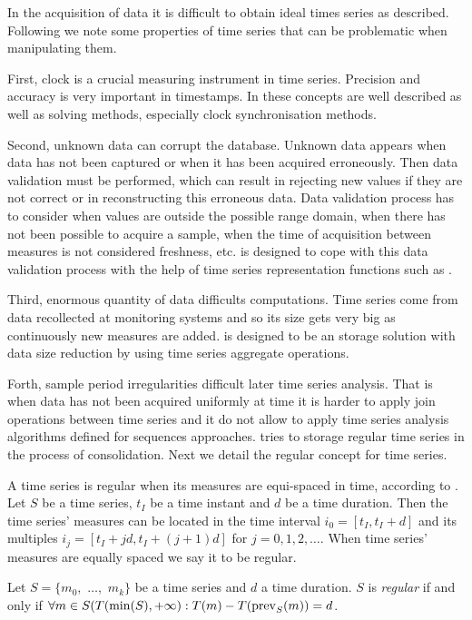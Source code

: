 In the acquisition of data it is difficult to obtain ideal times
series as described. Following we note some properties of time series
that can be problematic when manipulating them.

First, clock is a crucial measuring instrument in time
series. Precision and accuracy is very important in timestamps.  In
\cite{kopetz11:realtime} these concepts are well described as well as
solving methods, especially clock synchronisation methods.


Second, unknown data can corrupt the database. Unknown data appears
when data has not been captured or when it has been acquired
erroneously. Then data validation must be performed, which can result
in rejecting new values if they are not correct or in reconstructing
this erroneous data.  Data validation process has to consider when
values are outside the possible range domain, when there has not been
possible to acquire a sample, when the time of acquisition between
measures is not considered freshness, etc.  is designed to
cope with this data validation process with the help of time series
representation functions such as \zohe{}.


Third, enormous quantity of data difficults computations.  Time series
come from data recollected at monitoring systems and so its size gets
very big as continuously new measures are added.   is
designed to be an storage solution with data size reduction by using
time series aggregate operations.


Forth, sample period irregularities difficult later time series
analysis. That is when data has not been acquired uniformly at time it
is harder to apply join operations between time series and it do not
allow to apply time series analysis algorithms defined for sequences
approaches.   tries to storage regular time series in the
process of consolidation.  Next we detail the regular concept for time
series.


A time series is regular when its measures are equi-spaced in time,
according to \cite{last:hetland}. Let $S$ be a time series, $t_I$
be a time instant and $d$ be a time duration. Then the time
series' measures can be located in the time interval $i_0=[t_I,
t_I+d]$ and its multiples $i_j=[t_I+jd, t_I+(j+1)d]$
for $j=0,1,2,\ldots$. When time series' measures are equally spaced we
say it to be regular.

\begin{definition}
  Let $S=\{m_0,$ $\ldots,$ $m_k\}$ be a time series and $d$ a time
  duration. $S$ is \emph{regular} if and only if $\forall m \in
  S(T(\min(S),+\infty):T(m) - T(\operatorname*{prev}_S(m)) = d$.
\end{definition}


